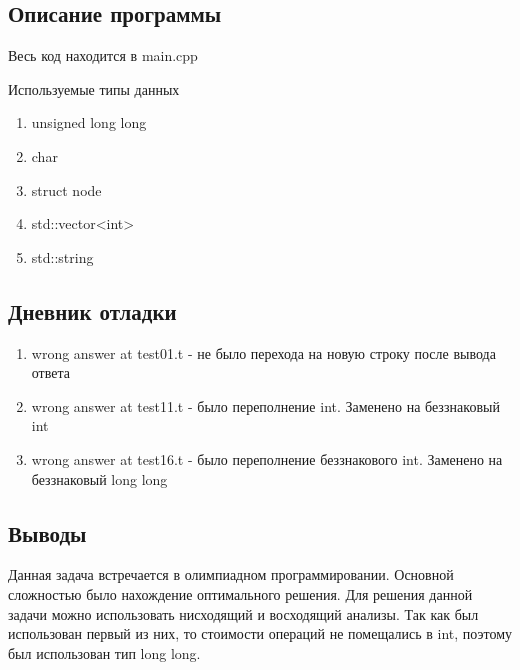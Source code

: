 \documentclass[12pt]{article}
\begin{document}
\subsection*{Описание программы}

Весь код находится в main.cpp

Используемые типы данных
\begin{enumerate}
\item unsigned long long
\item char
\item struct node
\item std::vector<int>
\item std::string
\end{enumerate}


\subsection*{Дневник отладки}

\begin{enumerate}
\item wrong answer at test01.t - не было перехода на новую строку после вывода ответа
\item wrong answer at test11.t - было переполнение int. Заменено на беззнаковый int
\item wrong answer at test16.t - было переполнение беззнакового int. Заменено на беззнаковый long long
\end{enumerate}

\subsection*{Выводы}

Данная задача встречается в олимпиадном программировании. Основной сложностью было нахождение оптимального решения. Для решения данной задачи можно использовать нисходящий и восходящий анализы. Так как был использован первый из них, то стоимости операций не помещались в int, поэтому был использован тип long long. 
\end{document}
